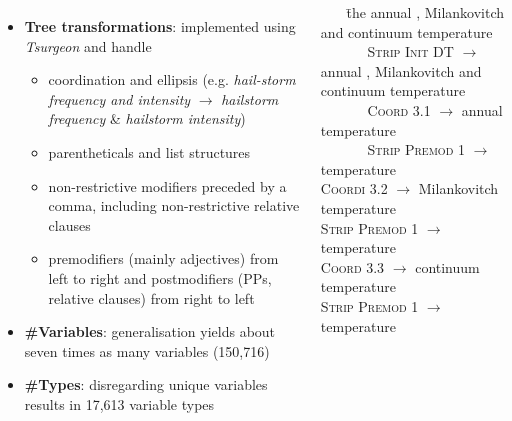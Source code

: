 \documentclass[24pt, a0papper, portrait]{tikzposter}
\newcommand{\point}[1]{\textbf{\textcolor{colorThree}{#1}}:}
\begin{document}
\begin{columns}
{\begin{itemize}
\item \point{Tree transformations} implemented using \emph{Tsurgeon} and handle 
\begin{itemize}
\item coordination and ellipsis (e.g. \emph{hail-storm frequency and intensity} $\rightarrow$ \emph{hailstorm frequency} \& \emph{hailstorm intensity})
\item parentheticals and list structures
\item non-restrictive modifiers preceded by a comma, including non-restrictive relative clauses
\item premodifiers (mainly adjectives) from left to right and postmodifiers (PPs, relative clauses) from right to left
\end{itemize}

\item \point{\#Variables} generalisation yields about seven times as many variables (150,716)

\item \point{\#Types} disregarding unique variables results in 17,613 variable types 
\end{itemize}    
}




{
\vspace{-1cm}
\begin{tabbing}
~~~ \= the annual , Milankovitch and continuum temperature \\
\> ~~~~~~ \= \textsc{Strip Init DT} $\rightarrow$ annual , Milankovitch and continuum temperature \\
\>         \> ~~~~~~ \= \textsc{Coord 3.1} $\rightarrow$  annual temperature \\
\>         \> \> ~~~~~~ \=   \textsc{Strip Premod 1} $\rightarrow$  temperature \\
\>         \> \>  \textsc{Coordi 3.2} $\rightarrow$  Milankovitch temperature \\
\>            \> \> \>         \textsc{Strip Premod 1} $\rightarrow$  temperature \\
\>            \> \> \textsc{Coord 3.3} $\rightarrow$ continuum temperature \\
 \>            \> \> \>        \textsc{Strip Premod 1} $\rightarrow$  temperature \\
\end{tabbing}
\vspace{-2cm}
}

\end{columns}
\end{document}
